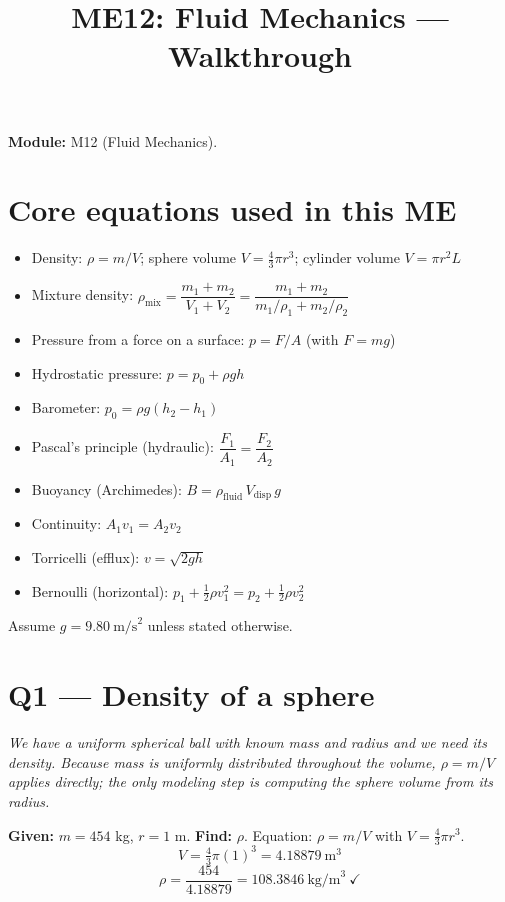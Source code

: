 \documentclass[11pt]{article}
\title{ME12: Fluid Mechanics --- Walkthrough}
\author{}
\date{}
\newcommand{\checkmk}{\ensuremath{\checkmark}}
\begin{document}
\maketitle

\textbf{Module:} M12 (Fluid Mechanics).

\section*{Core equations used in this ME}
\begin{itemize}[leftmargin=*]
  \item Density: $\rho = m/V$; sphere volume $V = \tfrac{4}{3}\pi r^3$; cylinder volume $V=\pi r^2 L$
  \item Mixture density: $\rho_{\text{mix}} = \dfrac{m_1+m_2}{V_1+V_2} = \dfrac{m_1+m_2}{m_1/\rho_1 + m_2/\rho_2}$
  \item Pressure from a force on a surface: $p = F/A$ (with $F=mg$)
  \item Hydrostatic pressure: $p = p_0 + \rho g h$
  \item Barometer: $p_0 = \rho g (h_2 - h_1)$
  \item Pascal's principle (hydraulic): $\dfrac{F_1}{A_1}=\dfrac{F_2}{A_2}$
  \item Buoyancy (Archimedes): $B = \rho_{\text{fluid}}\, V_{\text{disp}}\, g$
  \item Continuity: $A_1 v_1 = A_2 v_2$
  \item Torricelli (efflux): $v = \sqrt{2gh}$
  \item Bernoulli (horizontal): $p_1 + \tfrac{1}{2}\rho v_1^2 = p_2 + \tfrac{1}{2}\rho v_2^2$
\end{itemize}
Assume $g = 9.80\ \text{m/s}^2$ unless stated otherwise.

\section*{Q1 --- Density of a sphere}
\emph{We have a uniform spherical ball with known mass and radius and we need its density. Because mass is uniformly distributed throughout the volume, $\rho = m/V$ applies directly; the only modeling step is computing the sphere volume from its radius.}

\textbf{Given:} $m = 454$ kg, $r = 1$ m. \textbf{Find:} $\rho$. Equation: $\rho = m/V$ with $V = \tfrac{4}{3}\pi r^3$.
\[ V = \tfrac{4}{3}\pi(1)^3 = 4.18879\ \text{m}^3 \]
\[ \rho = \frac{454}{4.18879} = \boxed{108.3846\ \text{kg/m}^3}\ \checkmk \]
\end{document}
